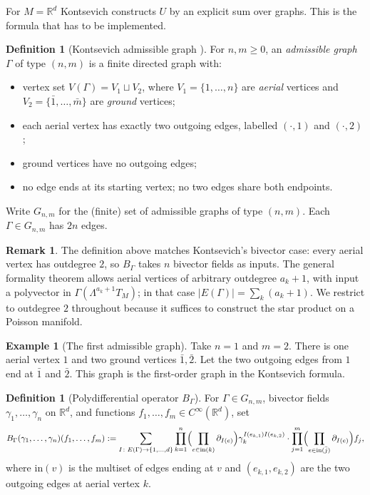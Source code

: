 \documentclass[11pt,a4paper]{article}
\theoremstyle{definition}
\newtheorem{definition}[theorem]{Definition}
\newtheorem{example}[theorem]{Example}
\newtheorem{remark}[theorem]{Remark}
\newcommand{\R}{\mathbb{R}}
\newcommand{\Cinfty}{C^{\infty}}
\newcommand{\defi}[1]{\emph{#1}}
\begin{document}
For $M = \R^{d}$ Kontsevich constructs $U$ by an explicit sum over
graphs. This is the formula that has to be implemented.

\begin{definition}[Kontsevich admissible graph {\cite[\S6.1]{Kontsevich2003}}]
\label{def:graph}
For $n, m \ge 0$, an \defi{admissible graph} $\Gamma$ of type $(n, m)$
is a finite directed graph with:
\begin{itemize}[leftmargin=2em]
  \item vertex set $V(\Gamma) = V_{1} \sqcup V_{2}$, where
        $V_{1} = \{1, \dots, n\}$ are \defi{aerial} vertices and
        $V_{2} = \{\bar 1, \dots, \bar m\}$ are \defi{ground} vertices;
  \item each aerial vertex has exactly two outgoing edges, labelled
        $(\cdot, 1)$ and $(\cdot, 2)$;
  \item ground vertices have no outgoing edges;
  \item no edge ends at its starting vertex; no two edges share both
        endpoints.
\end{itemize}
Write $G_{n,m}$ for the (finite) set of admissible graphs of type
$(n, m)$. Each $\Gamma \in G_{n,m}$ has $2n$ edges.
\end{definition}

\begin{remark}\label{rem:bivectors-only}
The definition above matches Kontsevich's bivector case: every aerial
vertex has outdegree $2$, so $B_{\Gamma}$ takes $n$ bivector fields as
inputs. The general formality theorem allows aerial vertices of
arbitrary outdegree $a_{k}+1$, with input a polyvector in
$\Gamma(\Lambda^{a_{k}+1} T_M)$; in that case
$|E(\Gamma)|=\sum_{k}(a_{k}+1)$. We restrict to outdegree $2$
throughout because it suffices to construct the star product on a
Poisson manifold.
\end{remark}

\begin{example}[The first admissible graph]
\label{ex:first-graph}
Take $n=1$ and $m=2$. There is one aerial vertex $1$ and two ground
vertices $\bar1,\bar2$. Let the two outgoing edges from $1$ end at
$\bar1$ and $\bar2$. This graph is the first-order graph in the
Kontsevich formula.
\end{example}

\begin{definition}[Polydifferential operator $B_\Gamma$]
\label{def:BGamma}
For $\Gamma \in G_{n,m}$, bivector fields $\gamma_{1}, \dots, \gamma_{n}$
on $\R^{d}$, and functions $f_{1}, \dots, f_{m} \in \Cinfty(\R^{d})$, set
\[
B_{\Gamma}(\gamma_{1}, \dots, \gamma_{n})(f_{1}, \dots, f_{m})
:= \sum_{I \colon E(\Gamma) \to \{1, \dots, d\}}
\prod_{k=1}^{n} \Bigl(\prod_{e \in \mathrm{in}(k)} \partial_{I(e)}\Bigr)
\gamma_{k}^{I(e_{k,1}) I(e_{k,2})}
\cdot
\prod_{j=1}^{m} \Bigl(\prod_{e \in \mathrm{in}(\bar j)} \partial_{I(e)}\Bigr) f_{j},
\]
where $\mathrm{in}(v)$ is the multiset of edges ending at $v$ and
$(e_{k,1}, e_{k,2})$ are the two outgoing edges at aerial vertex $k$.
\end{definition}
\end{document}

